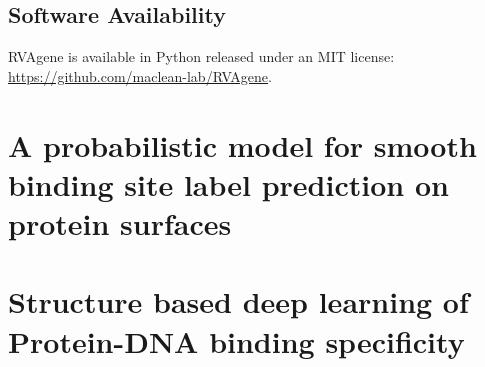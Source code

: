 \documentclass[letterpaper,11pt]{report}
\begin{document}
\section*{Software Availability}
RVAgene is available in Python released under an MIT license:  \url{https://github.com/maclean-lab/RVAgene}.



% 

\chapter{A probabilistic model for smooth binding site label prediction on protein surfaces}
\label{cha:research_topic_2}

\vspace*{0.35in}

\begin{flushleft}




\end{flushleft}







%
%
%
%

\chapter{Structure based deep learning of Protein-DNA binding specificity}






\end{document}

